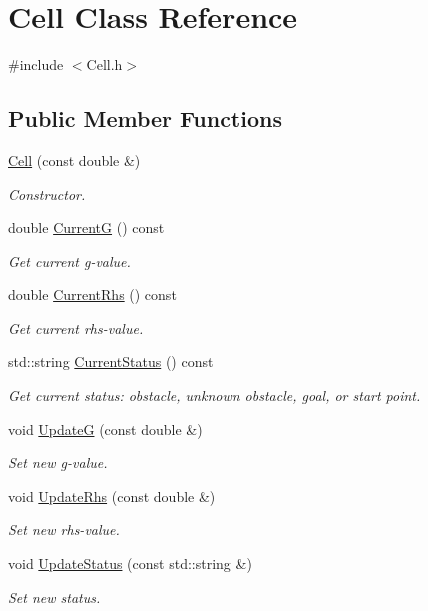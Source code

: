 \hypertarget{classCell}{}\section{Cell Class Reference}
\label{classCell}


{\ttfamily \#include $<$Cell.\+h$>$}

\subsection*{Public Member Functions}
\begin{DoxyCompactItemize}
\item 
\hyperlink{classCell_aee96d9f51d2abd240fa7d8061eebc8a0}{Cell} (const double \&)
\begin{DoxyCompactList}\small\item\em Constructor. \end{DoxyCompactList}\item 
double \hyperlink{classCell_a0ca45f795cf14859fd7eca8803a5f51b}{CurrentG} () const 
\begin{DoxyCompactList}\small\item\em Get current g-\/value. \end{DoxyCompactList}\item 
double \hyperlink{classCell_a8660018031fb8566c5b8525850d25a78}{Current\+Rhs} () const 
\begin{DoxyCompactList}\small\item\em Get current rhs-\/value. \end{DoxyCompactList}\item 
std\+::string \hyperlink{classCell_a23e5e30481833f9d186705b040d6888d}{Current\+Status} () const 
\begin{DoxyCompactList}\small\item\em Get current status\+: obstacle, unknown obstacle, goal, or start point. \end{DoxyCompactList}\item 
void \hyperlink{classCell_a000478bd99b10e1840d780c03482bb56}{UpdateG} (const double \&)
\begin{DoxyCompactList}\small\item\em Set new g-\/value. \end{DoxyCompactList}\item 
void \hyperlink{classCell_a68af196b8617146072088d8db25cf9dd}{Update\+Rhs} (const double \&)
\begin{DoxyCompactList}\small\item\em Set new rhs-\/value. \end{DoxyCompactList}\item 
void \hyperlink{classCell_aea41691b31c08258e6d5b637e026aa03}{Update\+Status} (const std\+::string \&)
\begin{DoxyCompactList}\small\item\em Set new status. \end{DoxyCompactList}\end{DoxyCompactItemize}


